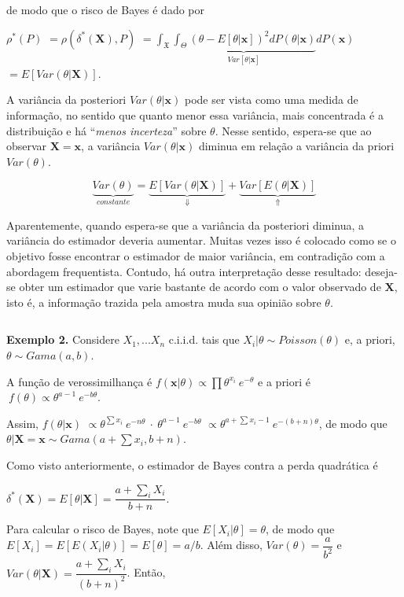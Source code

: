 \documentclass[
]{book}
\begin{document}
de modo que o risco de Bayes é dado por

\({\rho}^*\left(P\right)\) \(=\rho\left(\delta^*(\boldsymbol X),P\right)\) \(=\displaystyle \int_{\mathfrak{X}} \underbrace{ \int_{\Theta}(\theta-E[\theta|\boldsymbol{x}])^2dP(\theta|\boldsymbol{x})}_{Var[\theta|\boldsymbol{x}]}dP(\boldsymbol{x})\) \(=E\left[Var(\theta|\boldsymbol X)\right]\).

A variância da posteriori \(Var(\theta|\boldsymbol x)\) pode ser vista como uma medida de informação, no sentido que quanto menor essa variância, mais concentrada é a distribuição e há ``\emph{menos incerteza}'' sobre \(\theta\). Nesse sentido, espera-se que ao observar \(\boldsymbol X=\boldsymbol x\), a variância \(Var(\theta|\boldsymbol x)\) diminua em relação a variância da priori \(Var(\theta)\).

\[\underbrace{Var(\theta)}_{constante}=\underbrace{E\left[Var(\theta|\boldsymbol X)\right]}_{\boldsymbol \Downarrow}+\underbrace{Var\left[E(\theta|\boldsymbol X)\right]}_{\boldsymbol \Uparrow}\]

Aparentemente, quando espera-se que a variância da posteriori diminua, a variância do estimador deveria aumentar. Muitas vezes isso é colocado como se o objetivo fosse encontrar o estimador de maior variância, em contradição com a abordagem frequentista. Contudo, há outra interpretação desse resultado: deseja-se obter um estimador que varie bastante de acordo com o valor observado de \(\boldsymbol X\), isto é, a informação trazida pela amostra muda sua opinião sobre \(\theta\).

\(~\)

\textbf{Exemplo 2.} Considere \(X_1,...X_n\) c.i.i.d. tais que \(X_i|\theta\sim Poisson(\theta)\) e, a priori, \(\theta \sim Gama(a,b)\).

A função de verossimilhança é \(f(\boldsymbol x | \theta)\propto \prod {\theta}^{x_i}~{e}^{-\theta}\) e a priori é \(~f(\theta)\propto{\theta}^{a-1}~{e}^{-b\theta}\).

Assim, \(f(\theta | \boldsymbol x)\) \(\propto {\theta}^{\sum x_i}~{e}^{-n\theta} ~\cdot~ {\theta}^{a-1}~{e}^{-b\theta}\) \(\propto {\theta}^{a+\sum x_i-1}~{e}^{-(b+n)\theta}\), de modo que \(\theta|\boldsymbol X=\boldsymbol x\sim Gama\left(a+\sum x_i,b+n\right)\).

Como visto anteriormente, o estimador de Bayes contra a perda quadrática é

\(\delta^*(\boldsymbol X)=E[\theta|\boldsymbol X]=\dfrac{a+\sum_iX_i}{b+n}\).

Para calcular o risco de Bayes, note que \(E[X_i|\theta]=\theta\), de modo que \(E[X_i]=E\left[E(X_i|\theta)\right]=E[\theta]=a/b\). Além disso, \(Var(\theta)=\dfrac{a}{b^2}\) e \(Var(\theta|\boldsymbol X)=\dfrac{a+\sum_iX_i}{(b+n)^2}\). Então,
\end{document}
